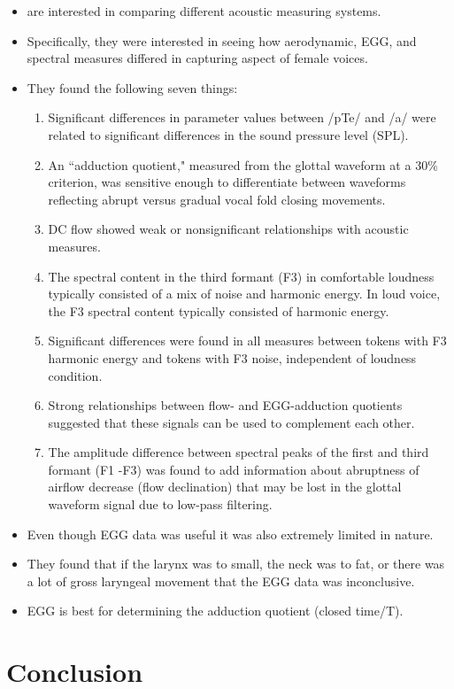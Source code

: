 \documentclass[12pt, letterpaper]{article}
\begin{document}
\begin{itemize}
	\item \citet{holmbergComparisonsAerodynamicElectroglottographic1995} are interested in comparing different acoustic measuring systems. 
	\item Specifically, they were interested in seeing how aerodynamic, EGG, and spectral measures differed in capturing aspect of female voices. 
	\item They found the following seven things:
	\begin{enumerate}
		\item Significant differences in parameter values between /pTe/ and /a/ were related to significant differences in the sound pressure level (SPL).
		\item An ``adduction quotient," measured from the glottal waveform at a 30\% criterion, was sensitive enough to differentiate between waveforms reflecting abrupt versus gradual vocal fold closing movements. 
		\item DC flow showed weak or nonsignificant relationships with acoustic measures. 
		\item The spectral content in the third formant (F3) in comfortable loudness typically consisted of a mix of noise and harmonic energy. In loud voice, the F3 spectral content typically consisted of harmonic energy. 
		\item Significant differences were found in all measures between tokens with F3 harmonic energy and tokens with F3 noise, independent of loudness condition. 
		\item Strong relationships between flow- and EGG-adduction quotients suggested that these signals can be used to complement each other.
		\item The amplitude difference between spectral peaks of the first and third formant (F1 -F3) was found to add information about abruptness of airflow decrease (flow declination) that may be lost in the glottal waveform signal due to low-pass filtering.
	\end{enumerate}
	\item Even though EGG data was useful it was also extremely limited in nature. 
	\item They found that if the larynx was to small, the neck was to fat, or there was a lot of gross laryngeal movement that the EGG data was inconclusive. 
	\item EGG is best for determining the adduction quotient (closed time/T). 
\end{itemize}

\section{Conclusion} \label{sec:Conclusion}


\printbibliography[heading=bibintoc]
\end{document}
